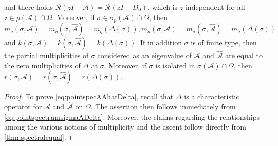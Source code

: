 \documentclass[english]{myarticle}
\begin{document}
\begin{sloppypar}
\begin{corollary}
and there holds $\mathcal{R}(zI-\mathcal{A}) = \mathcal{R}(zI-D_0)$, which is $z$-independent for all $z \in \rho(\mathcal{A}) \cap \Omega$. Moreover, if $\sigma \in \sigma_p(\mathcal{A}) \cap \Omega$, then $m_g(\sigma,\mathcal{A}) = m_g(\sigma,\hat{\mathcal{A}}) = m_g(\Delta(\sigma)), m_a(\sigma,\mathcal{A}) = m_a(\sigma,\hat{\mathcal{A}}) = m_a(\Delta(\sigma))$ and $k(\sigma,\mathcal{A}) = k(\sigma,\hat{\mathcal{A}}) = k(\Delta(\sigma))$. If in addition $\sigma$ is of finite type, then the partial multiplicities of $\sigma$ considered as an eigenvalue of $\mathcal{A}$ and $\hat{\mathcal{A}}$ are equal to the zero multiplicities of $\Delta$ at $\sigma$. Moreover, if $\sigma$ is isolated in $\sigma(\mathcal{A}) \cap \Omega$, then $r(\sigma,\mathcal{A}) = r(\sigma,\hat{\mathcal{A}}) = r(\Delta(\sigma))$.
\end{corollary}
\begin{proof}
To prove \eqref{eq:pointspecAAhatDelta}, recall that $\Delta$ is a characteristic operator for $\mathcal{A}$ and $\hat{\mathcal{A}}$ on $\Omega$. The assertion then follows immediately from \eqref{eq:pointspectrumsigmaADelta}. Moreover, the claims regarding the relationships among the various notions of multiplicity and the ascent follow directly from \cref{thm:spectralequal}.


\end{proof}
\end{sloppypar}
\end{document}
